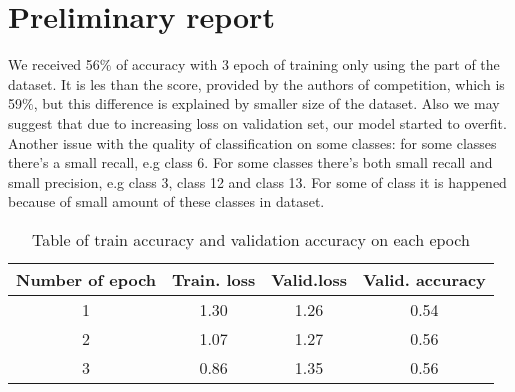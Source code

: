 \documentclass{article}
\begin{document}




  
\section{Preliminary report}

We received 56$\%$ of accuracy with 3 epoch of training only using the part of the dataset. It is les than the score, provided by the authors of competition, which is 59$\%$, but this difference is explained by smaller size of the dataset. Also we may suggest that due to increasing loss on validation set, our model started to overfit. Another issue with the quality of classification on some classes: for some classes there's a small recall, e.g class 6. For some classes there's both small recall and small precision, e.g class 3, class 12 and class 13. For some of class it is happened because of small amount of these classes in dataset. 


\begin{table}[bhtp]
	\centering
	\caption{Table of train accuracy and validation accuracy on each epoch}
	\label{tbl:space_and_subspace}
	\begin{tabular}{| c | c | c | c | }
		\hline
		Number of epoch & Train. loss & Valid.loss & Valid. accuracy \\
		\hline
		1 & 1.30  & 1.26 & 0.54  \\
        \hline
		2 & 1.07 & 1.27 & 0.56  \\
		\hline
        3 & 0.86  & 1.35 & 0.56  \\
        \hline
	\end{tabular}
\end{table}
\end{document}
